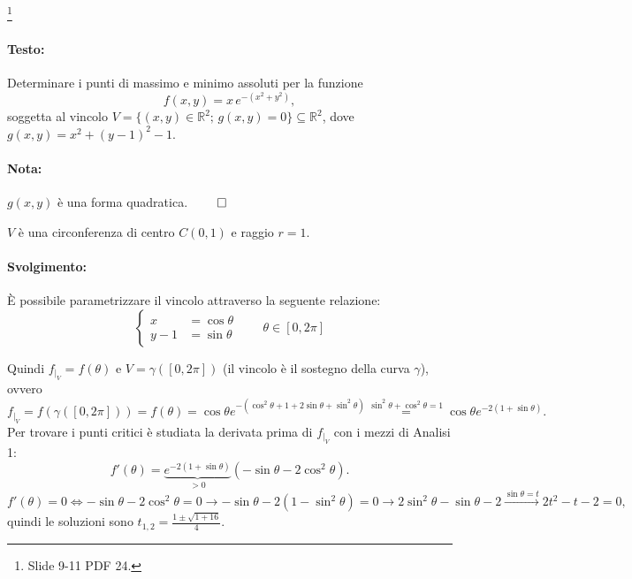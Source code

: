 \begin{example}\footnote{Slide 9-11 PDF 24.}
	\paragraph{Testo:} Determinare i punti di massimo e minimo assoluti per la funzione
	\begin{equation*}
		f(x,y) = x\, e^{-(x^2+y^2)},
	\end{equation*}
	soggetta al vincolo $V=\{(x,y)\in\mathbb{R}^2;\, g(x,y) = 0\}\subseteq\mathbb{R}^2$, dove $g(x,y) = x^2 + (y-1)^2 - 1$.
	
	\paragraph{Nota:} $g(x,y)$ è una forma quadratica. $\qed$
	
	$V$ è una circonferenza di centro $C(0,1)$ e raggio $r=1$.
	
	\paragraph{Svolgimento:} È possibile parametrizzare il vincolo attraverso la seguente relazione:
	\begin{equation*}
		\begin{cases}
			x &= \cos\theta\\
			y-1 &= \sin\theta 
		\end{cases}\qquad \theta\in[0,2\pi]
	\end{equation*}
	
	Quindi $f_{|_V} = f(\theta)$ e $V=\gamma ([0,2\pi])$ (il vincolo è il sostegno della curva $\gamma$), ovvero
	\begin{equation*}
		f_{|_V} = f(\gamma([0,2\pi])) = f(\theta) = \cos\theta e^{-(\cos^2\theta + 1 + 2\sin\theta + \sin^2\theta)} \overset{\sin^2\theta+\cos^2\theta = 1}{=} \cos\theta e^{-2(1+\sin\theta)}.
	\end{equation*}
	Per trovare i punti critici è studiata la derivata prima di $f_{|_V}$ con i mezzi di Analisi 1:
	\begin{equation*}
		f'(\theta) = \underbrace{e^{-2(1+\sin\theta)}}_{>0} (-\sin\theta - 2\cos^2\theta).
	\end{equation*}
	\begin{equation*}
		f'(\theta) = 0 \iff -\sin\theta - 2\cos^2\theta = 0 \rightarrow -\sin\theta - 2(1-\sin^2\theta) = 0 \rightarrow 2\sin^2\theta - \sin\theta - 2 \overset{\sin\theta = t}{\longrightarrow} 2 t^2 - t - 2 = 0, 
	\end{equation*}
	quindi le soluzioni sono $t_{1,2} = \frac{1 \pm \sqrt{1+ 16}}{4}$.
	

\end{example}
